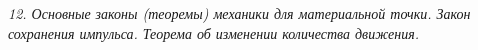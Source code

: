 \emph{12. Основные законы (теоремы) механики для материальной точки. Закон
сохранения импульса. Теорема об изменении количества движения.}

\newpage %
